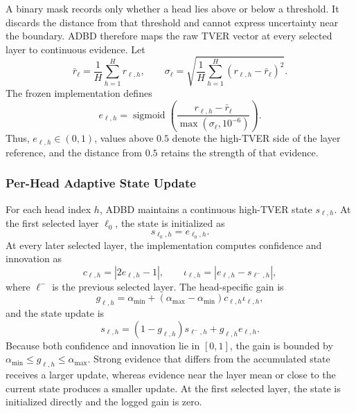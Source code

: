 A binary mask records only whether a head lies above or below a threshold. It discards the distance from that threshold and cannot express uncertainty near the boundary. ADBD therefore maps the raw TVER vector at every selected layer to continuous evidence. Let
\begin{equation}
\bar r_{\ell}=\frac{1}{H}\sum_{h=1}^{H}r_{\ell,h},
\qquad
\sigma_{\ell}=
\sqrt{\frac{1}{H}\sum_{h=1}^{H}(r_{\ell,h}-\bar r_\ell)^2}.
\end{equation}
The frozen implementation defines
\begin{equation}
e_{\ell,h}
=
\operatorname{sigmoid}\!\left(
\frac{r_{\ell,h}-\bar r_{\ell}}
     {\max(\sigma_{\ell},10^{-6})}
\right).
\label{eq:continuous_evidence}
\end{equation}
Thus, $e_{\ell,h}\in(0,1)$, values above $0.5$ denote the high-TVER side of the layer reference, and the distance from $0.5$ retains the strength of that evidence.

\subsubsection{Per-Head Adaptive State Update}

For each head index $h$, ADBD maintains a continuous high-TVER state $s_{\ell,h}$. At the first selected layer $\ell_0$, the state is initialized as
\begin{equation}
s_{\ell_0,h}=e_{\ell_0,h}.
\end{equation}
At every later selected layer, the implementation computes confidence and innovation as
\begin{equation}
c_{\ell,h}=\left|2e_{\ell,h}-1\right|,
\qquad
\iota_{\ell,h}
=\left|e_{\ell,h}-s_{\ell^{-},h}\right|,
\end{equation}
where $\ell^{-}$ is the previous selected layer. The head-specific gain is
\begin{equation}
g_{\ell,h}
=
\alpha_{\min}
+(\alpha_{\max}-\alpha_{\min})
c_{\ell,h}\iota_{\ell,h},
\label{eq:adaptive_gain}
\end{equation}
and the state update is
\begin{equation}
s_{\ell,h}
=(1-g_{\ell,h})s_{\ell^{-},h}
+g_{\ell,h}e_{\ell,h}.
\label{eq:state_update}
\end{equation}
Because both confidence and innovation lie in $[0,1]$, the gain is bounded by
$\alpha_{\min}\leq g_{\ell,h}\leq\alpha_{\max}$. Strong evidence that differs from the accumulated state receives a larger update, whereas evidence near the layer mean or close to the current state produces a smaller update. At the first selected layer, the state is initialized directly and the logged gain is zero.

